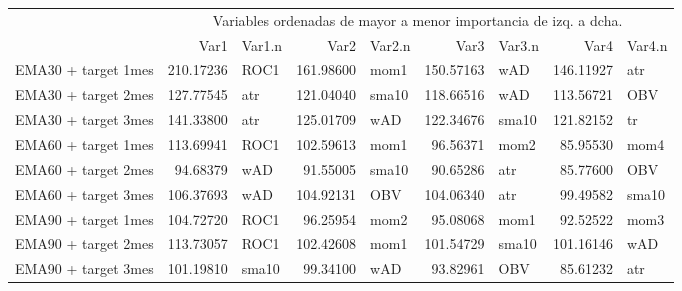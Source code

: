 \documentclass[]{article}
\newenvironment{Shaded}{\begin{snugshade}}{\end{snugshade}}
\newcommand{\CommentTok}[1]{\textcolor[rgb]{0.56,0.35,0.01}{\textit{#1}}}
\begin{document}
\begin{table}[H]
\centering\begingroup\fontsize{10}{12}\selectfont

\begin{tabular}{l|r|l|r|l|r|l|r|l}
\hline
\multicolumn{1}{c|}{ } & \multicolumn{8}{|c}{Variables ordenadas de mayor a menor importancia de izq. a dcha.} \\
\cline{2-9}
  & Var1 & Var1.n & Var2 & Var2.n & Var3 & Var3.n & Var4 & Var4.n\\
\hline
EMA30 + target 1mes & 210.17236 & ROC1 & 161.98600 & mom1 & 150.57163 & wAD & 146.11927 & atr\\
\hline
EMA30 + target 2mes & 127.77545 & atr & 121.04040 & sma10 & 118.66516 & wAD & 113.56721 & OBV\\
\hline
EMA30 + target 3mes & 141.33800 & atr & 125.01709 & wAD & 122.34676 & sma10 & 121.82152 & tr\\
\hline
EMA60 + target 1mes & 113.69941 & ROC1 & 102.59613 & mom1 & 96.56371 & mom2 & 85.95530 & mom4\\
\hline
EMA60 + target 2mes & 94.68379 & wAD & 91.55005 & sma10 & 90.65286 & atr & 85.77600 & OBV\\
\hline
EMA60 + target 3mes & 106.37693 & wAD & 104.92131 & OBV & 104.06340 & atr & 99.49582 & sma10\\
\hline
EMA90 + target 1mes & 104.72720 & ROC1 & 96.25954 & mom2 & 95.08068 & mom1 & 92.52522 & mom3\\
\hline
EMA90 + target 2mes & 113.73057 & ROC1 & 102.42608 & mom1 & 101.54729 & sma10 & 101.16146 & wAD\\
\hline
EMA90 + target 3mes & 101.19810 & sma10 & 99.34100 & wAD & 93.82961 & OBV & 85.61232 & atr\\
\hline
\end{tabular}\endgroup{}
\end{table}

\begin{Shaded}
\end{Shaded}
\end{document}
